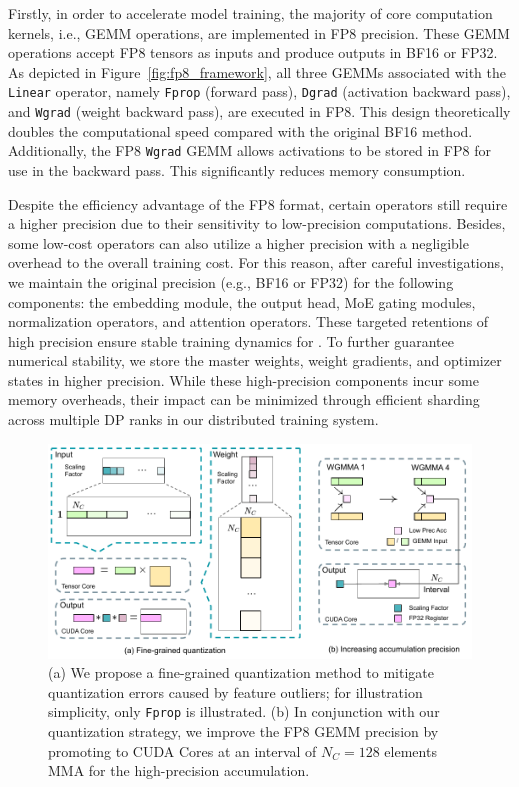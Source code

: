 Firstly, in order to accelerate model training, the majority of core computation kernels, i.e., GEMM operations, are implemented in FP8 precision. 
These GEMM operations accept FP8 tensors as inputs and produce outputs in BF16 or FP32. 
As depicted in Figure~\ref{fig:fp8_framework}, all three GEMMs associated with the \texttt{Linear} operator, namely \texttt{Fprop} (forward pass), \texttt{Dgrad} (activation backward pass), and \texttt{Wgrad} (weight backward pass), are executed in FP8. 
This design theoretically doubles the computational speed compared with the original BF16 method. 
Additionally, the FP8 \texttt{Wgrad} GEMM allows activations to be stored in FP8 for use in the backward pass. 
This significantly reduces memory consumption.

Despite the efficiency advantage of the FP8 format, certain operators still require a higher precision due to their sensitivity to low-precision computations. 
Besides, some low-cost operators can also utilize a higher precision with a negligible overhead to the overall training cost. 
For this reason, after careful investigations, we maintain the original precision (e.g., BF16 or FP32) for the following components: the embedding module, the output head, MoE gating modules, normalization operators, and attention operators. 
These targeted retentions of high precision ensure stable training dynamics for \dsviii{}.
To further guarantee numerical stability, we store the master weights, weight gradients, and optimizer states in higher precision. 
While these high-precision components incur some memory overheads, their impact can be minimized through efficient sharding across multiple DP ranks in our distributed training system.

\begin{figure}[!t]
\centering
\includegraphics[width=0.95\linewidth]{figures/fp8-128accumulatorv4.pdf}
\caption{
    (a) We propose a fine-grained quantization method to mitigate quantization errors caused by feature outliers; for illustration simplicity, only \texttt{Fprop} is illustrated. 
    (b) In conjunction with our quantization strategy, we improve the FP8 GEMM precision by promoting to CUDA Cores at an interval of $N_C=128$ elements MMA for the high-precision accumulation. 
}
\label{fig:fp8_quantization}
\end{figure}

